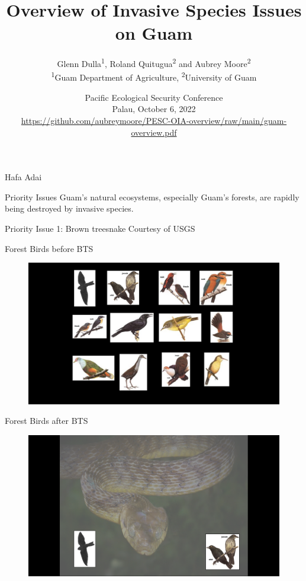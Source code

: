 \documentclass[]{beamer}
\title[Invasive Species Issues on Guam]{Overview of Invasive Species Issues on Guam}
\author[]{
	Glenn Dulla\textsuperscript{1}, Roland Quitugua\textsuperscript{2} and Aubrey Moore\textsuperscript{2}\\
	\bigskip 
	\tiny{\textsuperscript{1}Guam Department of Agriculture,
    \textsuperscript{2}University of Guam}
}
\date[]{Pacific Ecological Security Conference\\Palau, October 6, 2022\\ \tiny\url{https://github.com/aubreymoore/PESC-OIA-overview/raw/main/guam-overview.pdf}}
\begin{document}
	
    \maketitle

\begin{frame}{Hafa Adai}
\end{frame}

\begin{frame}{Priority Issues}
	Guam's natural ecosystems, especially Guam's forests, are rapidly being destroyed by invasive species.
	
	
\end{frame}

\begin{frame}{Priority Issue 1: Brown treesnake}
	\tiny{Courtesy of USGS}
\end{frame}

\begin{frame}{Forest Birds before BTS}
	\begin{figure}
		\includegraphics[height=0.8\textheight]{images/birds-before-bts.png}
	\end{figure}
\end{frame}

\begin{frame}{Forest Birds after BTS}
	\begin{figure}
		\includegraphics[height=0.8\textheight]{images/birds-after-bts.png}
	\end{figure}
\end{frame}
\end{document}
